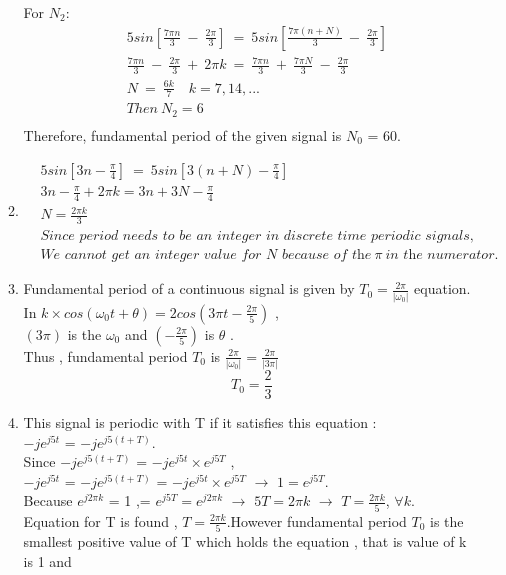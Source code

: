 \documentclass[10pt,a4paper, margin=1in]{article}
\begin{document}
\begin{enumerate}
\begin{enumerate}
    For $N_2$: \\
    \begin{align*}
    &5sin[\frac{7 \pi n}{3} \ - \ \frac{2 \pi}{3}] \ = \ 5sin[\frac{7 \pi (n+N)}{3} \ - \ \frac{2 \pi}{3}] \\
    &\frac{7 \pi n}{3} \ - \ \frac{2\pi}{3} \ + \ 2 \pi k \ = \ \frac{7 \pi n}{3} \ + \ \frac{7 \pi N}{3} \ - \ \frac{2\pi}{3} \\
    &N \ = \ \frac{6k}{7} \quad k=7,14,... \\
    &Then \ N_2 = 6 \\
    \end{align*}
    Therefore, fundamental period of the given signal is $N_0$ = 60.
    \item %
    \begin{align*}
    &5sin[3n - \frac{\pi}{4}] \ = \ 5sin[3(n+N) - \frac{\pi}{4}] \\
    &3n - \frac{\pi}{4} + 2\pi k = 3n + 3N - \frac{\pi}{4} \\
    &N = \frac{2\pi k}{3} \\
    & \textit{Since period needs to be an integer in discrete time periodic signals, this signal is not periodic.} \\
    & \textit{We cannot get an integer value for N because of the} \ \pi \ \textit{in the numerator.}    
    \end{align*}
    \item %
    
     
    Fundamental period of a continuous signal is given by $T_0 = \frac{2\pi}{|\omega_0|}$ equation.\\ 
    In $k\times cos(\omega_0 t + \theta) = 2cos(3\pi t-\frac{2\pi}{5})$ ,\\
	$(3\pi)$ is the $\omega_0$ and $(-\frac{2\pi}{5})$ is $\theta$ .\\
	Thus , fundamental period $T_0$ is  $\frac{2\pi}{|\omega_0|} = \frac{2\pi}{|3\pi|}$ \\
	
	\[
 \boxed{T_0 = \frac{2}{3}}
 \] 
    
    \item %
    
    This signal is periodic with T if it satisfies this equation :\\
    $-je^{j5t}$ = $-je^{j5(t+T)}$.\\
    Since $-je^{j5(t+T)}$ = $-je^{j5t}\times e^{j5T}$ ,\\
    $-je^{j5t}$ = $-je^{j5(t+T)}$ = $-je^{j5t}\times e^{j5T}$ $\rightarrow$ $1 = e^{j5T}$.\\
    Because $e^{j2\pi k}$ = 1 ,= $e^{j5T} = e^{j2\pi k}$ $\rightarrow$ $5T = 2\pi k$ $\rightarrow$ $T = \frac{2\pi k}{5}$, $\forall k $.\\
    Equation for T is found , $T = \frac{2\pi k}{5}$.However fundamental period $T_0$ is the smallest positive value of T which holds the equation , that is value of k is 1 and 
    

\end{enumerate}
\end{enumerate}
\end{document}
